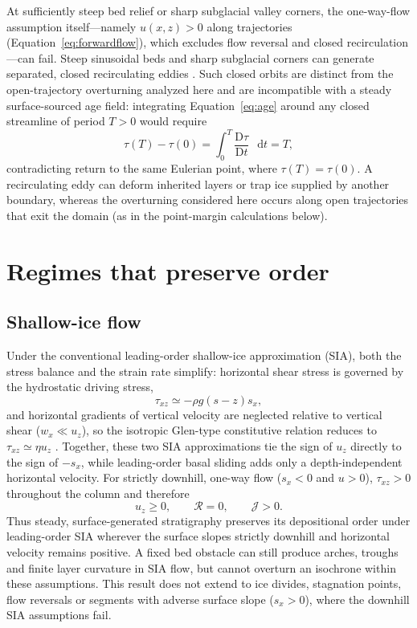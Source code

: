 \documentclass[review]{igs}
\begin{document}
At sufficiently steep bed relief or sharp subglacial valley corners, the one-way-flow assumption itself---namely \(u(x,z)>0\) along trajectories (Equation~\ref{eq:forwardflow}), which excludes flow reversal and closed recirculation---can fail. Steep sinusoidal beds and sharp subglacial corners can generate separated, closed recirculating eddies \citep{Gudmundsson1997nonlinear,Moffatt1964,MeyerCreyts2017}. Such closed orbits are distinct from the open-trajectory overturning analyzed here and are incompatible with a steady surface-sourced age field: integrating Equation~\ref{eq:age} around any closed streamline of period \(T>0\) would require
\begin{equation*}
\tau(T)-\tau(0)
=
\int_0^T\frac{\mathrm{D}\tau}{\mathrm{D}t}\,\mathop{}\!\mathrm{d} t
=T,
\end{equation*}
contradicting return to the same Eulerian point, where \(\tau(T)=\tau(0)\). A recirculating eddy can deform inherited layers or trap ice supplied by another boundary, whereas the overturning considered here occurs along open trajectories that exit the domain (as in the point-margin calculations below).

\section{Regimes that preserve order}

\subsection{Shallow-ice flow}

Under the conventional leading-order shallow-ice approximation (SIA), both the stress balance and the strain rate simplify: horizontal shear stress is governed by the hydrostatic driving stress,
\begin{equation}
\tau_{xz}\simeq-\rho g(s-z)s_x,
\label{eq:SIAstress}
\end{equation}
and horizontal gradients of vertical velocity are neglected relative to vertical shear (\(w_x\ll u_z\)), so the isotropic Glen-type constitutive relation reduces to \(\tau_{xz}\simeq\eta u_z\) \citep{CuffeyPaterson2010}. Together, these two SIA approximations tie the sign of \(u_z\) directly to the sign of \(-s_x\), while leading-order basal sliding adds only a depth-independent horizontal velocity. For strictly downhill, one-way flow (\(s_x<0\) and \(u>0\)), \(\tau_{xz}>0\) throughout the column and therefore
\begin{equation}
 u_z\geq0,
 \qquad \mathcal{R}=0,
 \qquad \mathcal{J}>0.
\label{eq:SIAorder}
\end{equation}
Thus steady, surface-generated stratigraphy preserves its depositional order under leading-order SIA wherever the surface slopes strictly downhill and horizontal velocity remains positive. A fixed bed obstacle can still produce arches, troughs and finite layer curvature in SIA flow, but cannot overturn an isochrone within these assumptions. This result does not extend to ice divides, stagnation points, flow reversals or segments with adverse surface slope (\(s_x>0\)), where the downhill SIA assumptions fail.
\end{document}
